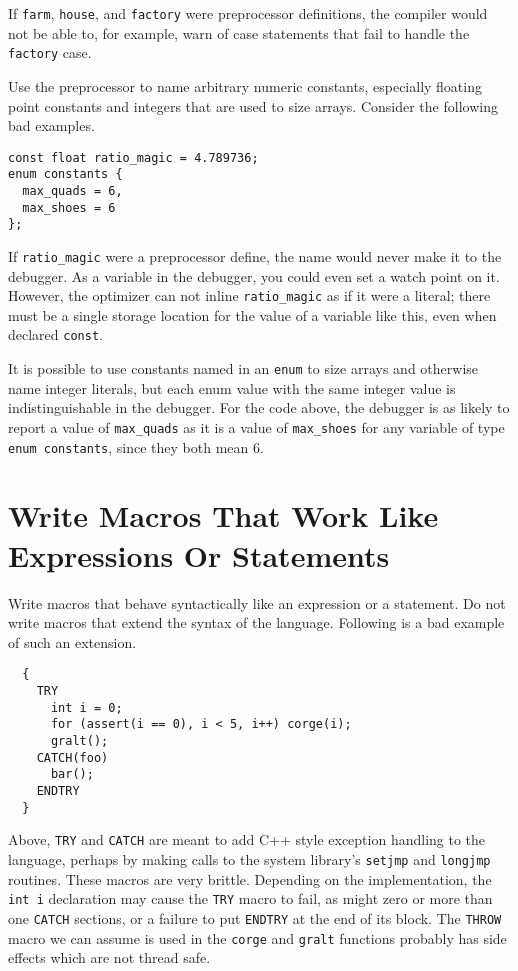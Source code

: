\documentclass{lulu}
\newcommand{\code}[1]{\texttt{#1}\xspace}
\begin{document}
If \code{farm}, \code{house}, and \code{factory} were preprocessor
definitions, the compiler would not be able to, for example, warn of
case statements that fail to handle the \code{factory} case.

Use the preprocessor to name arbitrary numeric constants, especially
floating point constants and integers that are used to size arrays.
Consider the following bad examples.

\begin{samepage}
\begin{verbatim}
const float ratio_magic = 4.789736;
enum constants {
  max_quads = 6,
  max_shoes = 6
};
\end{verbatim}
\end{samepage}

If \code{ratio\_magic} were a preprocessor define, the name would
never make it to the debugger.  As a variable in the debugger, you
could even set a watch point on it.  However, the optimizer can not
inline \code{ratio\_magic} as if it were a literal; there must be a
single storage location for the value of a variable like this, even
when declared \code{const}.

It is possible to use constants named in an \code{enum} to size arrays
and otherwise name integer literals, but each enum value with the same
integer value is indistinguishable in the debugger.  For the code
above, the debugger is as likely to report a value of
\code{max\_quads} as it is a value of \code{max\_shoes} for any
variable of type \code{enum constants}, since they both mean 6.

\section{Write Macros That Work Like Expressions Or Statements}

Write macros that behave syntactically like an expression or a
statement.  Do not write macros that extend the syntax of the
language.  Following is a bad example of such an extension.

\begin{samepage}
\begin{verbatim}
  {
    TRY
      int i = 0;
      for (assert(i == 0), i < 5, i++) corge(i);
      gralt();
    CATCH(foo)
      bar();
    ENDTRY
  }
\end{verbatim}
\end{samepage}

Above, \code{TRY} and \code{CATCH} are meant to add C++ style
exception handling to the language, perhaps by making calls to the
system library's \code{setjmp} and \code{longjmp} routines.  These
macros are very brittle.  Depending on the implementation, the
\code{int i} declaration may cause the \code{TRY} macro to fail, as
might zero or more than one \code{CATCH} sections, or a failure to put
\code{ENDTRY} at the end of its block.  The \code{THROW} macro we can
assume is used in the \code{corge} and \code{gralt} functions probably
has side effects which are not thread safe.
\end{document}

